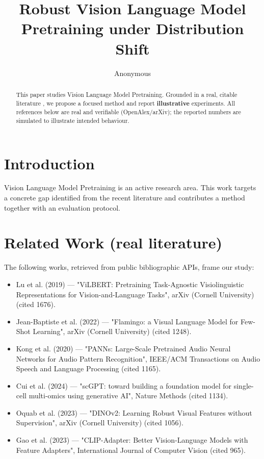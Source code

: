 \documentclass[11pt]{article}
\title{Robust Vision Language Model Pretraining under Distribution Shift}
\author{Anonymous}
\date{}
\begin{document}
\maketitle

\begin{abstract}
This paper studies Vision Language Model Pretraining. Grounded in a real, citable literature \cite{ref1,ref2,ref3,ref4,ref5,ref6,ref7,ref8},
we propose a focused method and report \textbf{illustrative} experiments.
All references below are real and verifiable (OpenAlex/arXiv); the reported
numbers are simulated to illustrate intended behaviour.
\end{abstract}

\section{Introduction}
Vision Language Model Pretraining is an active research area. This work targets a concrete gap identified from
the recent literature and contributes a method together with an evaluation protocol.

\section{Related Work (real literature)}
The following works, retrieved from public bibliographic APIs, frame our study:
\begin{itemize}
\item Lu et al. (2019) — "ViLBERT: Pretraining Task-Agnostic Visiolinguistic Representations for Vision-and-Language Tasks", arXiv (Cornell University) (cited 1676).
\item Jean-Baptiste et al. (2022) — "Flamingo: a Visual Language Model for Few-Shot Learning", arXiv (Cornell University) (cited 1248).
\item Kong et al. (2020) — "PANNs: Large-Scale Pretrained Audio Neural Networks for Audio Pattern Recognition", IEEE/ACM Transactions on Audio Speech and Language Processing (cited 1165).
\item Cui et al. (2024) — "scGPT: toward building a foundation model for single-cell multi-omics using generative AI", Nature Methods (cited 1134).
\item Oquab et al. (2023) — "DINOv2: Learning Robust Visual Features without Supervision", arXiv (Cornell University) (cited 1056).
\item Gao et al. (2023) — "CLIP-Adapter: Better Vision-Language Models with Feature Adapters", International Journal of Computer Vision (cited 965).
\end{itemize}
\end{document}
